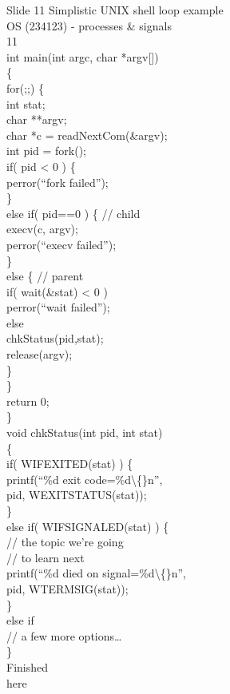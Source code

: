 \documentclass{beamer}
\begin{document}
\begin{frame}{Slide 11}
Simplistic UNIX shell loop example\\OS (234123) - processes \& signals\\11\\int main(int argc, char *argv[])\\\{\\  for(;;) \{\\      int stat;\\      char **argv;\\      char *c = readNextCom(\&argv);\\      int pid = fork();\\      if( pid < 0 ) \{\\          perror(“fork failed”);\\      \}\\      else if( pid==0 ) \{ // child\\          execv(c, argv);\\          perror(“execv failed”);\\      \}\\      else \{ // parent\\          if( wait(\&stat) < 0 )\\              perror(“wait failed”);\\          else\\              chkStatus(pid,stat);\\       release(argv);\\      \}\\  \}\\  return 0;\\\}\\void chkStatus(int pid, int stat)\\\{\\  if( WIFEXITED(stat) ) \{\\    printf(“\%d exit code=\%d\textbackslash\{\}n”,\\          pid, WEXITSTATUS(stat));\\  \}\\  else if( WIFSIGNALED(stat) ) \{\\    // the topic we’re going\\    // to learn next\\    printf(“\%d died on signal=\%d\textbackslash\{\}n”,\\          pid, WTERMSIG(stat));\\  \}\\  else if \\     // a few more options…\\\}\\Finished \\here
\end{frame}
\end{document}
